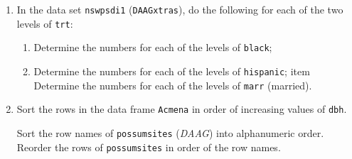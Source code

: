 \begin{enumerate}
\item In the data set \texttt{nswpsdi1} (\texttt{DAAGxtras}), do
the following for each of the two levels of \texttt{trt}:
\begin{enumerate}
  \item Determine the numbers for each of the levels of \texttt{black};
  \item Determine the numbers for each of the levels of \texttt{hispanic};
  item Determine the numbers for each of the levels of \texttt{marr} (married).
\end{enumerate}

\item Sort the rows in the data frame \texttt{Acmena} in order
of increasing values of \texttt{dbh}.

\begin{Schunk}
\end{Schunk}

Sort the row names of \texttt{possumsites} (\textit{DAAG}) into
alphanumeric order.  Reorder the rows of \texttt{possumsites} in order
of the row names.


\end{enumerate}
